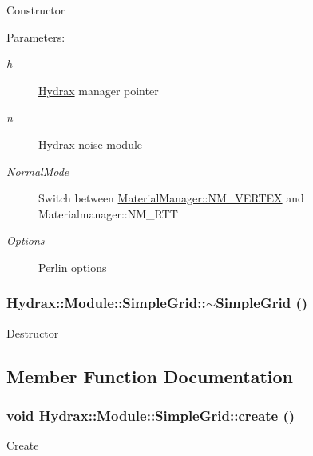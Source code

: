 Constructor \begin{Desc}
\item[Parameters:]
\begin{description}
\item[{\em h}]\hyperlink{class_hydrax_1_1_hydrax}{Hydrax} manager pointer \item[{\em n}]\hyperlink{class_hydrax_1_1_hydrax}{Hydrax} noise module \item[{\em NormalMode}]Switch between \hyperlink{class_hydrax_1_1_material_manager_aa14689cd1c259f48954dfecda9b296ffe4d6257f673cf503a9905fb2576288f}{MaterialManager::NM\_\-VERTEX} and Materialmanager::NM\_\-RTT \item[{\em \hyperlink{struct_hydrax_1_1_module_1_1_simple_grid_1_1_options}{Options}}]Perlin options \end{description}
\end{Desc}
\hypertarget{class_hydrax_1_1_module_1_1_simple_grid_a697faa687d55e5f211bae56e0ec9d14}{
\subsubsection[{$\sim$SimpleGrid}]{\setlength{\rightskip}{0pt plus 5cm}Hydrax::Module::SimpleGrid::$\sim$SimpleGrid ()}}
\label{class_hydrax_1_1_module_1_1_simple_grid_a697faa687d55e5f211bae56e0ec9d14}


Destructor 

\subsection{Member Function Documentation}
\hypertarget{class_hydrax_1_1_module_1_1_simple_grid_7e52fb7497f6a2d27666a384d7a1d003}{
\subsubsection[{create}]{\setlength{\rightskip}{0pt plus 5cm}void Hydrax::Module::SimpleGrid::create ()}}
\label{class_hydrax_1_1_module_1_1_simple_grid_7e52fb7497f6a2d27666a384d7a1d003}


Create 

